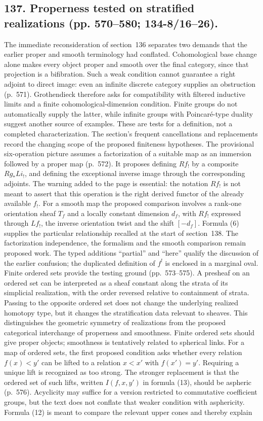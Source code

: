 \documentclass[10pt,oneside]{book}
\begin{document}
\subsection*{137. Properness tested on stratified realizations (pp. 570--580; 134-8/16--26).}
The immediate reconsideration of section~136 separates two demands that the earlier proper and smooth terminology had conflated. Cohomological base change alone makes every object proper and smooth over the final category, since that projection is a bifibration. Such a weak condition cannot guarantee a right adjoint to direct image: even an infinite discrete category supplies an obstruction (p.~571). Grothendieck therefore asks for compatibility with filtered inductive limits and a finite cohomological-dimension condition. Finite groups do not automatically supply the latter, while infinite groups with Poincar\'e-type duality suggest another source of examples. These are tests for a definition, not a completed characterization. The section's frequent cancellations and replacements record the changing scope of the proposed finiteness hypotheses. The provisional six-operation picture assumes a factorization of a suitable map as an immersion followed by a proper map (p.~572). It proposes defining $Rf_!$ by a composite $Rg_*Li_!$, and defining the exceptional inverse image through the corresponding adjoints. The warning added to the page is essential: the notation $Rf_!$ is not meant to assert that this operation is the right derived functor of the already available $f_!$. For a smooth map the proposed comparison involves a rank-one orientation sheaf $T_f$ and a locally constant dimension $d_f$, with $Rf_!$ expressed through $Lf_!$, the inverse orientation twist and the shift $[-d_f]$. Formula (6) supplies the particular relationship recalled at the start of section~138. The factorization independence, the formalism and the smooth comparison remain proposed work. The typed additions ``partial'' and ``here'' qualify the discussion of the earlier confusion; the duplicated definition of $f^!$ is enclosed in a marginal oval. Finite ordered sets provide the testing ground (pp.~573--575). A presheaf on an ordered set can be interpreted as a sheaf constant along the strata of its simplicial realization, with the order reversed relative to containment of strata. Passing to the opposite ordered set does not change the underlying realized homotopy type, but it changes the stratification data relevant to sheaves. This distinguishes the geometric symmetry of realizations from the proposed categorical interchange of properness and smoothness. Finite ordered sets should give proper objects; smoothness is tentatively related to spherical links. For a map of ordered sets, the first proposed condition asks whether every relation $f(x)<y'$ can be lifted to a relation $x<x'$ with $f(x')=y'$. Requiring a unique lift is recognized as too strong. The stronger replacement is that the ordered set of such lifts, written $I(f,x,y')$ in formula (13), should be aspheric (p.~576). Acyclicity may suffice for a version restricted to commutative coefficient groups, but the text does not conflate that weaker condition with asphericity. Formula (12) is meant to compare the relevant upper cones and thereby explain 
\end{document}
